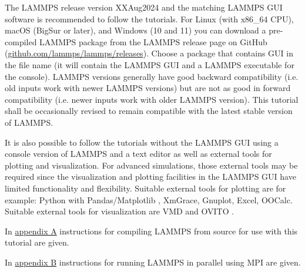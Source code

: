 \documentclass[9pt,tutorial]{livecoms}
\begin{document}
The LAMMPS release version XXAug2024 \cite{lammps_code} and the matching LAMMPS GUI software is recommended to follow the tutorials.  For Linux (with x86\_64 CPU), macOS (BigSur or later), and Windows (10 and 11) you can download a pre-compiled LAMMPS package from the LAMMPS release page on GitHub (\href{https://github.com/lammps/lammps/releases}{github.com/lammps/lammps/releases}). Choose a package that contains GUI in the file name (it will contain the LAMMPS GUI and a LAMMPS executable for the console).  LAMMPS versions generally have good backward compatibility (i.e. old inputs work with newer LAMMPS versions) but are not as good in forward compatibility (i.e. newer inputs work with older LAMMPS version).  This tutorial shall be occasionally revised to remain compatible with the latest stable version of LAMMPS.

It is also possible to follow the tutorials without the LAMMPS GUI using a console version of LAMMPS and a text editor as well as external tools for plotting and visualization.  For advanced simulations, those external tools may be required since the visualization and plotting facilities in the LAMMPS GUI have limited functionality and flexibility.  Suitable external tools for plotting are for example: Python with Pandas/Matplotlib \cite{van1995python, hunter2007Matplotlib}, XmGrace, Gnuplot, Excel, OOCalc.  Suitable external tools for visualization are VMD \cite{vmd_home,humphrey1996vmd} and OVITO \cite{ovito_home,ovito_paper}.

In \hyperref[compiling-lammps-label]{appendix A} instructions for compiling LAMMPS from source for use with this tutorial are given.

In \hyperref[parallel-lammps-label]{appendix B} instructions for running LAMMPS in parallel using MPI are given.

%
\end{document}
